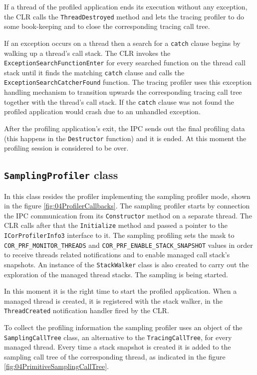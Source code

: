 If a thread of the profiled application ends its execution without any exception, the CLR calls the \texttt{ThreadDestroyed} method and lets the tracing profiler to do some book-keeping and to close the corresponding tracing call tree.

If an exception occurs on a thread then a search for a \texttt{catch} clause begins by walking up a thread's call stack. The CLR invokes the \texttt{ExceptionSearchFunctionEnter} for every searched function on the thread call stack until it finds the matching \texttt{catch} clause and calls the \texttt{ExceptionSearchCatcherFound} function. The tracing profiler uses this exception handling mechanism to transition upwards the corresponding tracing call tree together with the thread's call stack. If the \texttt{catch} clause was not found the profiled application would crash due to an unhandled exception.
 
After the profiling application's exit, the IPC sends out the final profiling data (this happens in the \texttt{Destructor} function) and it is ended. At this moment the profiling session is considered to be over.

\subsection{\texttt{SamplingProfiler} class}
In this class resides the profiler implementing the sampling profiler mode, shown in the figure \ref{fig:04ProfilerCallbacks}. The sampling profiler starts by connection the IPC communication from its \texttt{Constructor} method on a separate thread. The CLR calls after that the \texttt{Initialize} method and passed a pointer to the \texttt{ICorProfilerInfo3} interface to it. The sampling profiling sets the mask to \texttt{COR\_PRF\_MONITOR\_THREADS} and \texttt{COR\_PRF\_ENABLE\_STACK\_SNAPSHOT} values in order to receive threads related notifications and to enable managed call stack's snapshots. An instance of the \texttt{StackWalker} class is also created to carry out the exploration of the managed thread stacks. The sampling is being started.

In this moment it is the right time to start the profiled application. When a managed thread is created, it is registered with the stack walker, in the \texttt{ThreadCreated} notification handler fired by the CLR.

To collect the profiling information the sampling profiler uses an object of the \texttt{SamplingCallTree} class, an alternative to the \texttt{TracingCallTree}, for every managed thread. Every time a stack snapshot is created it is added to the sampling call tree of the corresponding thread, as indicated in the figure \ref{fig:04PrimitiveSamplingCallTree}. 

